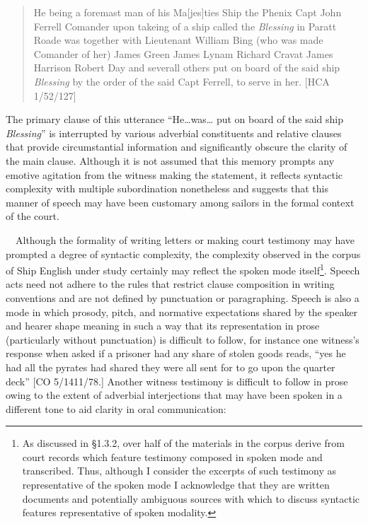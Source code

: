 \documentclass[12pt]{article}
\newenvironment{styleStandard}{\renewcommand\baselinestretch{1.0}\setlength\leftskip{0cm}\setlength\rightskip{0cm plus 1fil}\setlength\parindent{0cm}\setlength\parfillskip{0pt plus 1fil}\setlength\parskip{0in plus 1pt}\writerlistparindent\writerlistleftskip\leavevmode\normalfont\normalsize\writerlistlabel\ignorespaces}{\unskip\vspace{0in plus 1pt}\par}
\newcommand\writerlistleftskip{}
\newcommand\writerlistparindent{}
\newcommand\writerlistlabel{}
\begin{document}
\begin{quotation}
He being a foremast man of his Ma[jes]ties Ship the Phenix Capt John Ferrell Comander upon takeing of a ship called the \textit{Blessing} in Paratt Roade was together with Lieutenant William Bing (who was made Comander of her) James Green James Lynam Richard Cravat James Harrison Robert Day and severall others put on board of the said ship \textit{Blessing} by the order of the said Capt Ferrell, to serve in her. [HCA 1/52/127]

\end{quotation}
\begin{styleStandard}
The primary clause of this utterance “He…was… put on board of the said ship \textit{Blessing}” is interrupted by various adverbial constituents and relative clauses that provide circumstantial information and significantly obscure the clarity of the main clause. Although it is not assumed that this memory prompts any emotive agitation from the witness making the statement, it reflects syntactic complexity with multiple subordination nonetheless and suggests that this manner of speech may have been customary among sailors in the formal context of the court. 
\end{styleStandard}


\begin{styleStandard}
\ \ Although the formality of writing letters or making court testimony may have prompted a degree of syntactic complexity, the complexity observed in the corpus of Ship English under study certainly may reflect the spoken mode itself\footnote{ As discussed in §1.3.2, over half of the materials in the corpus derive from court records which feature testimony composed in spoken mode and transcribed. Thus, although I consider the excerpts of such testimony as representative of the spoken mode I acknowledge that they are written documents and potentially ambiguous sources with which to discuss syntactic features representative of spoken modality. }. Speech acts need not adhere to the rules that restrict clause composition in writing conventions and are not defined by punctuation or paragraphing. Speech is also a mode in which prosody, pitch, and normative expectations shared by the speaker and hearer shape meaning in such a way that its representation in prose (particularly without punctuation) is difficult to follow, for instance one witness’s response when asked if a prisoner had any share of stolen goods reads, “yes he had all the pyrates had shared they were all sent for to go upon the quarter deck” [CO 5/1411/78.] Another witness testimony is difficult to follow in prose owing to the extent of adverbial interjections that may have been spoken in a different tone to aid clarity in oral communication:
\end{styleStandard}
\end{document}
